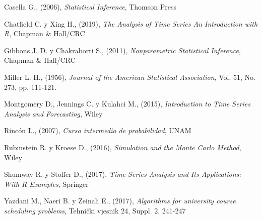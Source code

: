 \begin{thebibliography}{X}

 Casella G., (2006), \textit{Statistical Inference}, Thomson Press

 Chatfield C. y Xing H., (2019), \textit{The Analysis of Time Series An Introduction with R}, Chapman $\&$ Hall/CRC \label{ChatfieldXing}

 Gibbons J. D. y Chakraborti S., (2011), \textit{Nonparametric Statistical Inference}, Chapman $\&$ Hall/CRC %

 Miller L. H., (1956), \textit{Journal of the American Statistical Association}, Vol. 51, No. 273, pp. 111-121. \label{Miller}

 Montgomery D., Jennings C. y Kulahci M., (2015), \textit{Introduction to Time Series Analysis and Forecasting}, Wiley

 Rincón L., (2007), \textit{Curso intermedio de probabilidad}, UNAM

 Rubinstein R. y Kroese D., (2016), \textit{Simulation and the Monte Carlo Method}, Wiley%

 Shumway R. y Stoffer D., (2017), \textit{Time Series Analysis and Its Applications: With R Examples}, Springer

 Yazdani M., Naeri B. y Zeinali E., (2017), \textit{Algorithms for university course scheduling problems}, Tehnički vjesnik 24, Suppl. 2, 241-247 \label{Yazdani}









\end{thebibliography}
